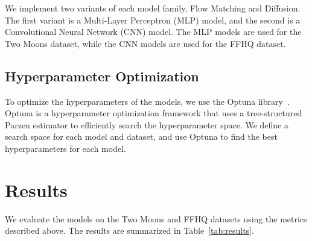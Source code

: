 \documentclass{article}
\begin{document}
We implement two variants of each model family, Flow Matching and Diffusion. The first variant is a Multi-Layer Perceptron (MLP) model, and the second is a Convolutional Neural Network (CNN) model. The MLP models are used for the Two Moons dataset, while the CNN models are used for the FFHQ dataset.

\subsection{Hyperparameter Optimization}

To optimize the hyperparameters of the models, we use the Optuna library~\cite{akiba2019optuna}. Optuna is a hyperparameter optimization framework that uses a tree-structured Parzen estimator to efficiently search the hyperparameter space. We define a search space for each model and dataset, and use Optuna to find the best hyperparameters for each model.

\section{Results}
We evaluate the models on the Two Moons and FFHQ datasets using the metrics described above. The results are summarized in Table~\ref{tab:results}.
\end{document}
